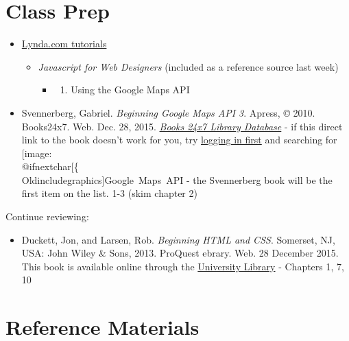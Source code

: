 \documentclass[]{book}
\makeatletter
\providecommand{\tightlist}{%
  \setlength{\itemsep}{0pt}\setlength{\parskip}{0pt}}
\def\ScaleIfNeeded{%
  \ifdim\Gin@nat@width>.5\linewidth
    .5\linewidth
  \else
    \Gin@nat@width
  \fi
}
\let\Oldincludegraphics\texttt{[image: \%
 \\catcode`\\@=11\\relax\%
 \%\\gdef\\includegraphics\{\\@ifnextchar[\{\\Oldincludegraphics]}{\Oldincludegraphics[width=\ScaleIfNeeded]}}%
\gdef\texttt{[image: \\@ifnextchar[\{\\Oldincludegraphics]}{\Oldincludegraphics[max size={.75\textwidth}{.75\textheight}]}}%
\makeatother
\begin{document}
\section{Class Prep}\label{week03-prep}

\begin{itemize}
\item
  \href{http://www.lynda.com/SharedPlaylist/2b710369c9ec4d8c964467225c6610ad?org=unm.edu}{Lynda.com
  tutorials}

  \begin{itemize}
  \tightlist
  \item
    \emph{Javascript for Web Designers} (included as a reference source
    last week)

    \begin{itemize}
    \item
      \begin{enumerate}
      \def\labelenumi{\arabic{enumi}.}
      \setcounter{enumi}{4}
      \tightlist
      \item
        Using the Google Maps API
      \end{enumerate}
    \end{itemize}
  \end{itemize}
\item
  Svennerberg, Gabriel. \emph{Beginning Google Maps API 3}. Apress, ©
  2010. Books24x7. Web. Dec. 28, 2015.
  \href{http://library.books24x7.com.libproxy.unm.edu/toc.aspx?bookid=36390\&refid=SVA3S}{\emph{Books
  24x7 Library Database}} - if this direct link to the book doesn't work
  for you, try
  \href{http://library.unm.edu/applications/dam/plink.php?db_id=238}{logging
  in first} and searching for \texttt{Google\ Maps\ API} - the
  Svennerberg book will be the first item on the list. 1-3 (skim chapter
  2)
\end{itemize}

Continue reviewing:

\begin{itemize}
\tightlist
\item
  Duckett, Jon, and Larsen, Rob. \emph{Beginning HTML and CSS}.
  Somerset, NJ, USA: John Wiley \& Sons, 2013. ProQuest ebrary. Web. 28
  December 2015. This book is available online through the
  \href{http://site.ebrary.com.libproxy.unm.edu/lib/unma/detail.action?docID=10667426}{University
  Library} - Chapters 1, 7, 10
\end{itemize}

\section{Reference Materials}\label{week03-reference}
\end{document}
